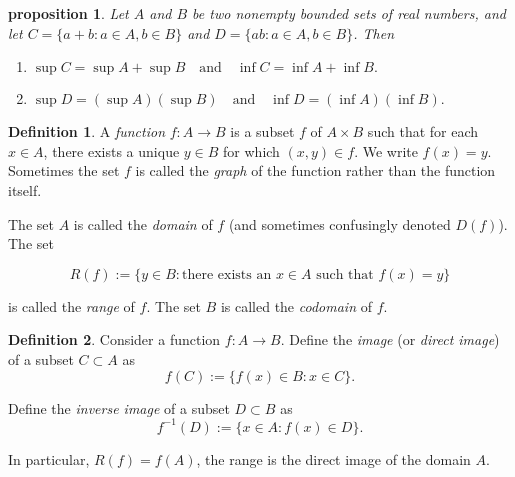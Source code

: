 \documentclass{article}
\newtheorem{proposition}{Proposition}[section]
\newtheorem{proposition}{proposition}[section]
\theoremstyle{definition}
\newtheorem{definition}{Definition}[section]
\theoremstyle{remark}
\begin{document}
\begin{proposition} \label{ex:sup_inf_algebra}
Let \( A \) and \( B \) be two nonempty bounded sets of real numbers, and let \( C = \{a + b : a \in A, b \in B\} \) and \( D = \{ab : a \in A, b \in B\} \). Then 
\begin{enumerate}
\item \(\sup C = \sup A + \sup B \quad \text{and} \quad \inf C = \inf A + \inf B.\)
\item \(\sup D = (\sup A)(\sup B) \quad \text{and} \quad \inf D = (\inf A)(\inf B). \)
\end{enumerate}

\end{proposition}
















\begin{definition} \label{def:function}
A \textit{function} \( f: A \to B \) is a subset \( f \) of \( A \times B \) such that for each \( x \in A \),
there exists a unique \( y \in B \) for which \( (x, y) \in f \). We write \( f(x) = y \). Sometimes the set \( f \) is
called the \textit{graph} of the function rather than the function itself.

The set \( A \) is called the \textit{domain} of \( f \) (and sometimes confusingly denoted \( D(f) \)). The set

\[
R(f) := \{y \in B : \text{there exists an } x \in A \text{ such that } f(x) = y\}
\]

is called the \textit{range} of \( f \). The set \( B \) is called the \textit{codomain} of \( f \).
\end{definition}















\begin{definition} \label{def:image_inverse_image}
Consider a function \( f: A \to B \). Define the \textit{image} (or \textit{direct image}) of a subset \( C \subset A \) as
\[
f(C) := \{ f(x) \in B : x \in C \}.
\]

Define the \textit{inverse image} of a subset \( D \subset B \) as
\[
f^{-1}(D) := \{ x \in A : f(x) \in D \}.
\]

In particular, \( R(f) = f(A) \), the range is the direct image of the domain \( A \).
\end{definition}
\end{document}
